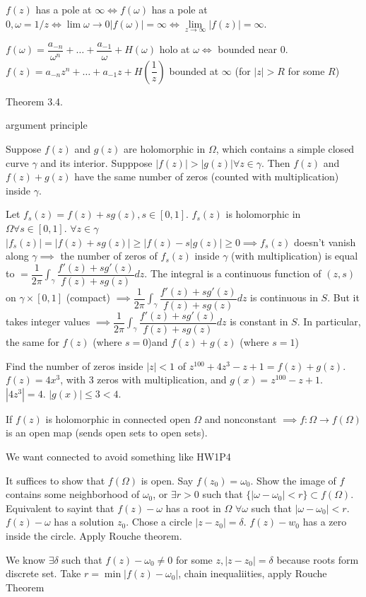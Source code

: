 \documentclass[twoside, 10pt]{article}
\begin{document}
$f(z)$ has a pole at $\infty \iff f(\omega)$ has a pole at $0, \omega = 1/z \iff \lim\limits{\omega\to0}|f(\omega)| = \infty \iff\lim\limits_{z\to\infty}|f(z)| = \infty$.

$f(\omega) = \dfrac{a_{-n}}{\omega^n} + \ldots + \dfrac{a_{-1}}{\omega} + H(\omega)$ holo at $\omega \iff$ bounded near 0. $f(z) = a_{-n}z^n + \ldots + a_{-1}z + H(\dfrac{1}{z})$ bounded at $\infty$ (for $|z| > R$ for some $R$)

Theorem 3.4.

argument principle

\begin{thm}
   Suppose $f(z)$ and $g(z)$ are holomorphic in $\Omega$, which contains a simple closed curve $\gamma$ and its interior. Supppose $|f(z)| > |g(z)| \forall z \in \gamma$. Then $f(z)$ and $f(z) + g(z)$ have the same number of zeros (counted with multiplication) inside $\gamma$.
\end{thm}
Let $f_s(z) = f(z) + sg(z), s\in [0, 1]$. $f_s(z)$ is holomorphic in $\Omega \forall s \in [0, 1]$. $\forall z\in \gamma$ $|f_s(z)| = |f(z) + sg(z)| \geq |f(z) - s|g(z)| \geq 0 \implies f_s(z)$ doesn't vanish along $\gamma \implies $ the number of zeros of $f_s(z)$ inside $\gamma$ (with multiplication) is equal to $= \dfrac{1}{2\pi}\int_\gamma \dfrac{f'(z) + sg'(z)}{f(z) + sg(z)}dz$.
 The integral is a continuous function of $(z, s)$ on $\gamma \times [0, 1]$ (compact) %
$\implies \dfrac{1}{2\pi}\int_\gamma \dfrac{f'(z) + sg'(z)}{f(z) + sg(z)}dz$ is continuous in $S$. But it takes integer values $\implies \dfrac{1}{2\pi}\int_\gamma \dfrac{f'(z) + sg'(z)}{f(z) + sg(z)}dz$ is constant in $S$. In particular, the same for $f(z)$ (where $s = 0$)and $f(z) + g(z)$ (where $s = 1$)

\begin{exm}
   Find the number of zeros inside $|z| < 1$ of $z^{100} + 4z^3 -z + 1 = f(z) + g(z)$. $f(z) = 4x^3$, with 3 zeros with multiplication, and $g(x) = z^{100} - z + 1$. $|4z^3| = 4$. $|g(x)| \leq 3 < 4$.
\end{exm}

\begin{thm}
   If $f(z)$ is holomorphic in connected open $\Omega$ and nonconstant $\implies f: \Omega \to f(\Omega)$ is an open map (sends open sets to open sets).
\end{thm}
\begin{rmk}
   We want connected to avoid something like HW1P4
\end{rmk}
It suffices to show that $f(\Omega)$ is open. Say $f(z_0) = \omega_0$. Show the image of $f$ contains some neighborhood of $\omega_0$, or $\exists r > 0$ such that $\{|\omega-\omega_0| < r\} \subset f(\Omega)$. Equivalent to sayint that $f(z) - \omega$ has a root in $\Omega$ $\forall \omega$ such that $|\omega - \omega_0| < r$. $f(z) - \omega$ has a solution $z_0$. Chose a circle $|z - z_0| = \delta$. $f(z) - w_0$ has a zero inside the circle.
Apply Rouche theorem. 

We know $\exists \delta$ such that $f(z) - \omega_0 \neq 0$ for some $z, |z-z_0| = \delta$ because roots form discrete set. Take $r = \min|f(z) - \omega_0|$, chain inequaliities, apply Rouche Theorem %

\end{document}
